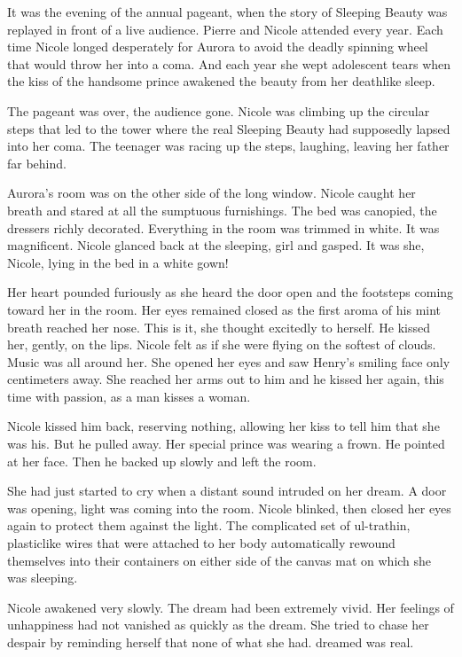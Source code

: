 \documentclass[]{article}
\begin{document}
{It was the evening of the annual pageant, when the story of Sleeping Beauty was replayed in front of a live audience. Pierre and Nicole attended every year. Each time Nicole longed desperately for Aurora to avoid the deadly spinning wheel that would throw her into a coma. And each year she wept adolescent tears when the kiss of the handsome prince awakened the beauty from her deathlike sleep.

The pageant was over, the audience gone. Nicole was climbing up the circular steps that led to the tower where the real Sleeping Beauty had supposedly lapsed into her coma. The teenager was racing up the steps, laughing, leaving her father far behind.

Aurora’s room was on the other side of the long window. Nicole caught her breath and stared at all the sumptuous furnishings. The bed was canopied, the dressers richly decorated. Everything in the room was trimmed in white. It was magnificent. Nicole glanced back at the sleeping, girl and gasped. It was she, Nicole, lying in the bed in a white gown!

Her heart pounded furiously as she heard the door open and the footsteps coming toward her in the room. Her eyes remained closed as the first aroma of his mint breath reached her nose. This is it, she thought excitedly to herself. He kissed her, gently, on the lips. Nicole felt as if she were flying on the softest of clouds. Music was all around her. She opened her eyes and saw Henry’s smiling face only centimeters away. She reached her arms out to him and he kissed her again, this time with passion, as a man kisses a woman.

Nicole kissed him back, reserving nothing, allowing her kiss to tell him that she was his. But he pulled away. Her special prince was wearing a frown. He pointed at her face. Then he backed up slowly and left the room.

She had just started to cry when a distant sound intruded on her dream. A door was opening, light was coming into the room. Nicole blinked, then closed her eyes again to protect them against the light. The complicated set of ul-trathin, plasticlike wires that were attached to her body automatically rewound themselves into their containers on either side of the canvas mat on which she was sleeping.

Nicole awakened very slowly. The dream had been extremely vivid. Her feelings of unhappiness had not vanished as quickly as the dream. She tried to chase her despair by reminding herself that none of what she had. dreamed was real.

}
\end{document}
